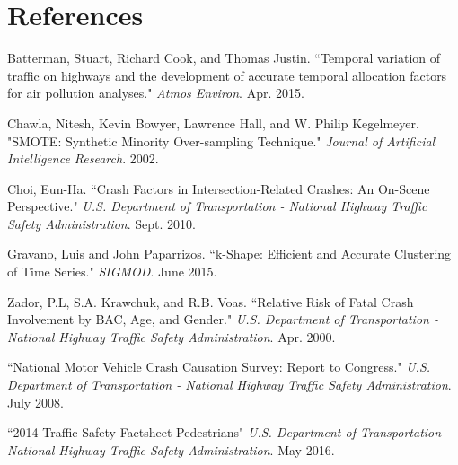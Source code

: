 \documentclass[11pt, oneside,titlepage]{article}   	%
\begin{document}
\section*{References}
\begin{hangparas}{1.27cm}{1}
Batterman, Stuart, Richard Cook, and Thomas Justin. ``Temporal variation of traffic on highways and the development of accurate temporal allocation factors for air pollution analyses." \textit{Atmos Environ}. Apr. 2015.

Chawla, Nitesh, Kevin Bowyer, Lawrence Hall, and W. Philip Kegelmeyer. "SMOTE: Synthetic Minority Over-sampling Technique." \textit{Journal of Artificial Intelligence Research}. 2002.

Choi, Eun-Ha. ``Crash Factors in Intersection-Related Crashes: An On-Scene Perspective." \textit{U.S. Department of Transportation - National Highway Traffic Safety Administration}. Sept. 2010.

Gravano, Luis and John Paparrizos. ``k-Shape: Efficient and Accurate Clustering of Time Series." \textit{SIGMOD}. June 2015.

Zador, P.L, S.A. Krawchuk, and R.B. Voas. ``Relative Risk of Fatal Crash Involvement by BAC, Age, and Gender." \textit{U.S. Department of Transportation - National Highway Traffic Safety Administration}. Apr. 2000.

``National Motor Vehicle Crash Causation Survey: Report to Congress." \textit{U.S. Department of Transportation - National Highway Traffic Safety Administration}. July 2008.

``2014 Traffic Safety Factsheet Pedestrians" \textit{U.S. Department of Transportation - National Highway Traffic Safety Administration}. May 2016.

\end{hangparas}
\end{document}
